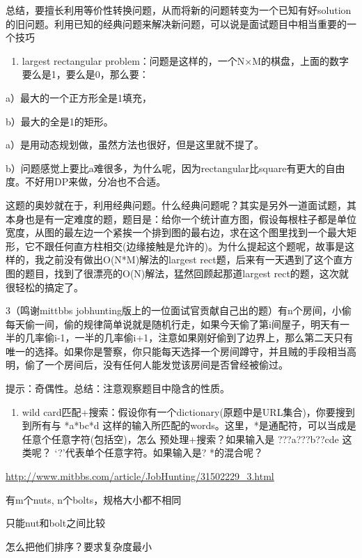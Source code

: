 \documentclass[12pt]{book}
\begin{document}
总结，要擅长利用等价性转换问题，从而将新的问题转变为一个已知有好solution的旧问题。利用已知的经典问题来解决新问题，可以说是面试题目中相当重要的一个技巧

\begin{enumerate}
\item largest rectangular problem：问题是这样的，一个N×M的棋盘，上面的数字要么是1，要么是0，那么要：
\end{enumerate}

a）最大的一个正方形全是1填充，

b）最大的全是1的矩形。

a）是用动态规划做，虽然方法也很好，但是这里就不提了。

b）问题感觉上要比a难很多，为什么呢，因为rectangular比square有更大的自由度。不好用DP来做，分冶也不合适。

这题的奥妙就在于，利用经典问题。什么经典问题呢？其实是另外一道面试题，其本身也是有一定难度的题，题目是：给你一个统计直方图，假设每根柱子都是单位宽度，从图的最左边一个紧挨一个排到图的最右边，求在这个图里找到一个最大矩形，它不跟任何直方柱相交(边缘接触是允许的)。为什么提起这个题呢，故事是这样的，我之前没有做出O(N*M)解法的largest rect题，后来有一天遇到了这个直方图的题目，找到了很漂亮的O(N)解法，猛然回顾起那道largest rect的题，这次就很轻松的搞定了。

3（鸣谢mittbbs jobhunting版上的一位面试官贡献自己出的题）有n个房间，小偷每天偷一间，偷的规律简单说就是随机行走，如果今天偷了第i间屋子，明天有一半的几率偷i-1，一半的几率偷i+1，注意如果刚好偷到了边界上，那么第二天只有唯一的选择。如果你是警察，你只能每天选择一个房间蹲守，并且贼的手段相当高明，偷了一个房间后，没有任何人能发觉该房间是否曾经被偷过。

提示：奇偶性。总结：注意观察题目中隐含的性质。

\begin{enumerate}
\item wild card匹配+搜索：假设你有一个dictionary(原题中是URL集合)，你要搜到到所有与 *a*bc*d 这样的输入所匹配的words。这里，*是通配符，可以当成是任意个任意字符(包括空)，怎么 预处理+搜索？如果输入是 ???a???b??cde 这类呢？ ‘?’代表单个任意字符。如果输入是? *的混合呢？
\end{enumerate}

\url{http://www.mitbbs.com/article/JobHunting/31502229_3.html}

有m个nuts, n个bolts，规格大小都不相同

只能nut和bolt之间比较

怎么把他们排序？要求复杂度最小
\end{document}
